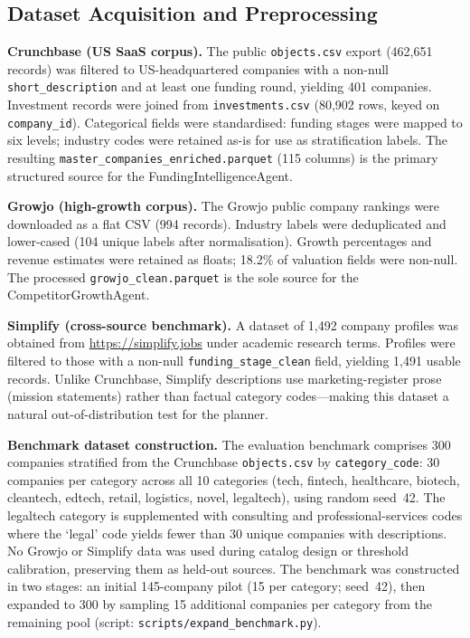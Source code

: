 \documentclass[preprint,12pt]{elsarticle}
\begin{document}
\subsection{Dataset Acquisition and Preprocessing}
\label{sec:method_data}

\textbf{Crunchbase (US SaaS corpus).} The public \texttt{objects.csv} export
(462,651 records) was filtered to US-headquartered companies with a non-null
\texttt{short\_description} and at least one funding round, yielding 401 companies.
Investment records were joined from \texttt{investments.csv} (80,902 rows, keyed
on \texttt{company\_id}). Categorical fields were standardised: funding stages
were mapped to six levels; industry codes were retained as-is for use as
stratification labels. The resulting \texttt{master\_companies\_enriched.parquet}
(115 columns) is the primary structured source for the FundingIntelligenceAgent.

\textbf{Growjo (high-growth corpus).} The Growjo public company rankings were
downloaded as a flat CSV (994 records). Industry labels were deduplicated and
lower-cased (104 unique labels after normalisation). Growth percentages and
revenue estimates were retained as floats; 18.2\% of valuation fields were
non-null. The processed \texttt{growjo\_clean.parquet} is the sole source for
the CompetitorGrowthAgent.

\textbf{Simplify (cross-source benchmark).} A dataset of 1,492 company profiles
was obtained from \url{https://simplify.jobs} under academic research terms.
Profiles were filtered to those with a non-null \texttt{funding\_stage\_clean}
field, yielding 1,491 usable records. Unlike Crunchbase, Simplify descriptions
use marketing-register prose (mission statements) rather than factual category
codes---making this dataset a natural out-of-distribution test for the planner.

\textbf{Benchmark dataset construction.} The evaluation benchmark comprises
300 companies stratified from the Crunchbase \texttt{objects.csv} by
\texttt{category\_code}: 30 companies per category across all 10 categories
(tech, fintech, healthcare, biotech, cleantech, edtech, retail, logistics,
novel, legaltech), using random seed~42. The legaltech category is supplemented
with consulting and professional-services codes where the `legal' code yields
fewer than 30 unique companies with descriptions. No Growjo or Simplify data was
used during catalog design or threshold calibration, preserving them as held-out
sources. The benchmark was constructed in two stages: an initial 145-company
pilot (15 per category; seed~42), then expanded to 300 by sampling 15 additional
companies per category from the remaining pool (script:
\texttt{scripts/expand\_benchmark.py}).
\end{document}
